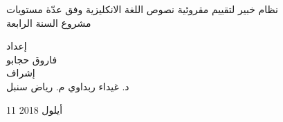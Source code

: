 	
	\vspace{2cm}
	\begin{center}
		{
			\Huge


			نظام خبير لتقييم مقروئية نصوص اللغة الانكليزية وفق عدّة مستويات
			\\[2.5mm]
			\Large
			مشروع السنة الرابعة
		}
	
		\vspace{3cm}
		\begin{doublespace}
			إعداد \\
			{
				\authorsfont
				فاروق حجابو \\[7mm]
			}
			إشراف \\[3mm]
			{
				\authorsfont
				د. غيداء ربداوي
				\hspace{2.5cm}
				م. رياض سنبل
			}
		\end{doublespace}
	\end{center}
		
	\vfill
	\centerline{11 أيلول 2018}
	


